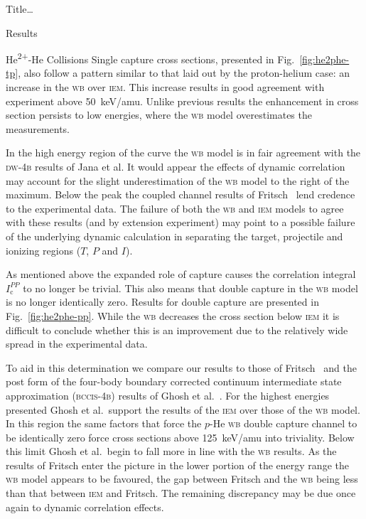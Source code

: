 \documentclass[letterpaper, 10 pt]{report}
\begin{document}
\begin{chapter}{ Title\dots \label{chap:p-he2p-he}}
\begin{section}{Results \label{sec:phe2p-res}}
\begin{subsection}{\texorpdfstring{He\textsuperscript{2+}}{He2+}-He Collisions 
                         \label{sec:he2phe-res}}
         Single capture cross sections, presented in Fig.~\ref{fig:he2phe-tp}, also follow a pattern
         similar to that laid out by the proton-helium case: an increase in the \textsc{wb} over
         \textsc{iem}. This increase results in good agreement with experiment above 50~keV/amu. Unlike
         previous results the enhancement in cross section persists to low energies, where the
         \textsc{wb} model overestimates the  measurements.

         In the high energy region of the curve the \textsc{wb} model is in fair agreement with the
         \textsc{dw-4b} results of Jana et al. It would appear the effects of dynamic correlation may
         account for the slight underestimation of the \textsc{wb} model to the right of the maximum.
         Below the peak the coupled channel results of Fritsch~\cite{Fritsch-94} lend credence to the
         experimental data. The failure of both the \textsc{wb} and \textsc{iem} models to agree with
         these results (and by extension experiment) may point to a possible failure of the underlying
         dynamic calculation in separating the target, projectile and ionizing regions ($T$, $P$ and
         $I$).

         As mentioned above the expanded role of capture causes the correlation integral
         $I^{PP}_\mathrm{c}$ to no longer be trivial. This also means that double capture in the
         \textsc{wb} model is no longer identically zero. Results for double capture are presented in
         Fig.~\ref{fig:he2phe-pp}. While the \textsc{wb} decreases the cross section below \textsc{iem}
         it is difficult to conclude whether this is an improvement due to the relatively wide spread in
         the experimental data.

         To aid in this determination we compare our results to those of Fritsch~\cite{Fritsch-94} and
         the post form of the four-body boundary corrected continuum intermediate state approximation
         (\textsc{bccis-4b}) results of Ghosh et al.~\cite{GDMP-08}. For the highest energies presented
         Ghosh et al.\ support the results of the \textsc{iem} over those of the \textsc{wb} model. In
         this region the same factors that force the $p$-He \textsc{wb} double capture channel to be
         identically zero force cross sections above 125~keV/amu into triviality. Below this limit Ghosh
         et al.\ begin to fall more in line with the \textsc{wb} results. As the results of Fritsch
         enter the picture in the lower portion of the energy range the \textsc{wb} model appears to be
         favoured, the gap between Fritsch and the \textsc{wb} being less than that between \textsc{iem}
         and Fritsch. The remaining discrepancy may be due once again to dynamic correlation effects.


\end{subsection}
\end{section}
\end{chapter}
\end{document}
